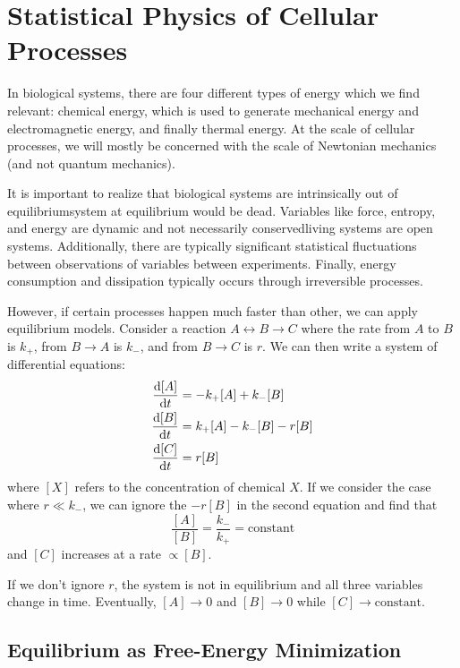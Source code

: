 \documentclass[a4paper,twoside,master.tex]{subfiles}
\begin{document}
\chapter{Statistical Physics of Cellular Processes}


In biological systems, there are four different types of energy which we find relevant: chemical energy, which is used to generate mechanical energy and electromagnetic energy, and finally thermal energy. At the scale of cellular processes, we will mostly be concerned with the scale of Newtonian mechanics (and not quantum mechanics).

It is important to realize that biological systems are intrinsically out of equilibrium\textemdash system at equilibrium would be dead. Variables like force, entropy, and energy are dynamic and not necessarily conserved\textemdash living systems are open systems. Additionally, there are typically significant statistical fluctuations between observations of variables between experiments. Finally, energy consumption and dissipation typically occurs through irreversible processes.

However, if certain processes happen much faster than other, we can apply equilibrium models. Consider a reaction $ A \leftrightarrow B \to C $ where the rate from $ A $ to $ B $ is $ k_+ $, from $ B \to A $ is $ k_- $, and from $ B \to C $ is $ r $. We can then write a system of differential equations:
\begin{align}
    \dv{[A]}{t} &= -k_+[A]+k_-[B] \\
    \dv{[B]}{t} &= k_+[A]-k_-[B]-r[B] \\
    \dv{[C]}{t} &= r[B] \\
\end{align}
where $ [X] $ refers to the concentration of chemical $ X $.
If we consider the case where $ r \ll k_- $, we can ignore the $ -r[B] $ in the second equation and find that
\begin{equation}
    \frac{[A]}{[B]} = \frac{k_-}{k_+} = \text{constant}
\end{equation}
and $ [C] $ increases at a rate $ \propto [B] $.

If we don't ignore $ r $, the system is not in equilibrium and all three variables change in time. Eventually, $ [A] \to 0 $ and $ [B] \to 0 $ while $ [C] \to \text{constant} $.


\section{Equilibrium as Free-Energy Minimization}\label{sec:equilibrium_as_free-energy_minimization}
\end{document}
